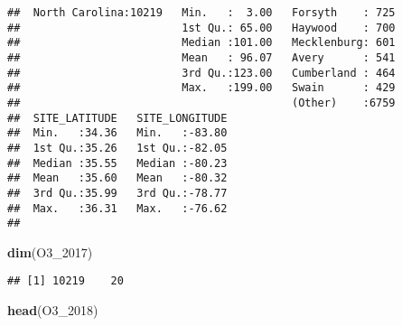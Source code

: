 \documentclass[]{article}
\newenvironment{Shaded}{\begin{snugshade}}{\end{snugshade}}
\newcommand{\KeywordTok}[1]{\textcolor[rgb]{0.13,0.29,0.53}{\textbf{#1}}}
\newcommand{\DecValTok}[1]{\textcolor[rgb]{0.00,0.00,0.81}{#1}}
\newcommand{\NormalTok}[1]{#1}
\begin{document}
\begin{verbatim}
##  North Carolina:10219   Min.   :  3.00   Forsyth    : 725  
##                         1st Qu.: 65.00   Haywood    : 700  
##                         Median :101.00   Mecklenburg: 601  
##                         Mean   : 96.07   Avery      : 541  
##                         3rd Qu.:123.00   Cumberland : 464  
##                         Max.   :199.00   Swain      : 429  
##                                          (Other)    :6759  
##  SITE_LATITUDE   SITE_LONGITUDE  
##  Min.   :34.36   Min.   :-83.80  
##  1st Qu.:35.26   1st Qu.:-82.05  
##  Median :35.55   Median :-80.23  
##  Mean   :35.60   Mean   :-80.32  
##  3rd Qu.:35.99   3rd Qu.:-78.77  
##  Max.   :36.31   Max.   :-76.62  
## 
\end{verbatim}

\begin{Shaded}
\begin{Highlighting}[]
\KeywordTok{dim}\NormalTok{(O3_}\DecValTok{2017}\NormalTok{)}
\end{Highlighting}
\end{Shaded}

\begin{verbatim}
## [1] 10219    20
\end{verbatim}

\begin{Shaded}
\begin{Highlighting}[]
\KeywordTok{head}\NormalTok{(O3_}\DecValTok{2018}\NormalTok{)}
\end{Highlighting}
\end{Shaded}
\end{document}
